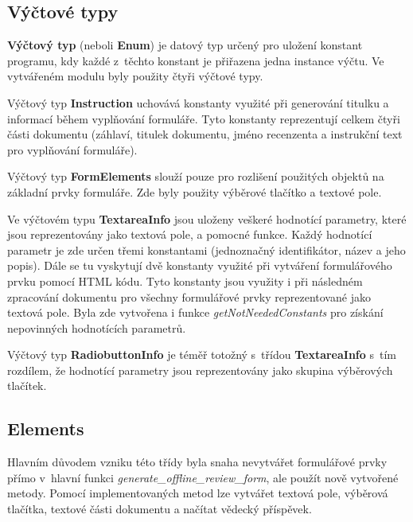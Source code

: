 \subsection{Výčtové typy}
\textbf{Výčtový typ} (neboli \textbf{Enum}) je datový typ určený pro uložení konstant programu, kdy každé z~těchto konstant je přiřazena jedna instance výčtu. Ve vytvářeném modulu byly použity čtyři výčtové typy. 
\par
Výčtový typ \textbf{Instruction} uchovává konstanty využité při generování titulku a informací během vyplňování formuláře. Tyto konstanty reprezentují celkem čtyři části dokumentu (záhlaví, titulek dokumentu, jméno recenzenta a instrukční text pro vyplňování formuláře).
\par
Výčtový typ \textbf{FormElements} slouží pouze pro rozlišení použitých objektů na základní prvky formuláře. Zde byly použity výběrové tlačítko a textové pole.
\par
Ve výčtovém typu \textbf{TextareaInfo} jsou uloženy veškeré hodnotící parametry, které jsou reprezentovány jako textová pole, a pomocné funkce. Každý hodnotící parametr je zde určen třemi konstantami (jednoznačný identifikátor, název a jeho popis). Dále se tu vyskytují dvě konstanty využité při vytváření formulářového prvku pomocí HTML kódu. Tyto konstanty jsou využity i při následném zpracování dokumentu pro všechny formulářové prvky reprezentované jako textová pole. Byla zde vytvořena i funkce \textit{getNotNeededConstants} pro získání nepovinných hodnotících parametrů.
\par
Výčtový typ \textbf{RadiobuttonInfo} je téměř totožný s~třídou \textbf{TextareaInfo} s~tím rozdílem, že hodnotící parametry jsou reprezentovány jako skupina výběrových tlačítek.
\subsection{Elements}
Hlavním důvodem vzniku této třídy byla snaha nevytvářet formulářové prvky přímo v~hlavní funkci \textit{generate\_offline\_review\_form}, ale použít nově vytvořené metody. Pomocí implementovaných metod lze vytvářet textová pole, výběrová tlačítka, textové části dokumentu a načítat vědecký příspěvek.
